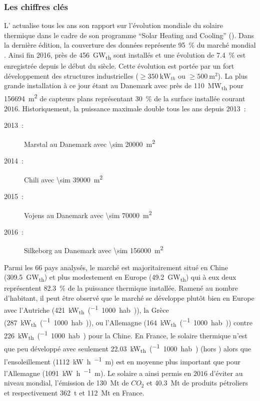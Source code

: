 \subsubsection{Les chiffres clés} %
\label{ssub:les_chiffres_cles}
L’ actualise tous les ans son rapport sur l’évolution mondiale du solaire thermique
dans le cadre de son programme \enquote{Solar Heating and Cooling} (). Dans la dernière
édition, la couverture des données représente \SI{95}{\percent} du
marché mondial \parencite{Weiss2017}. Ainsi fin 2016, près de \SI{456}{\giga\watt_{th}}
sont installés et une évolution de \SI{7.4}{\percent} est enregistrée depuis le début du
siècle. Cette évolution est portée par un fort développement des structures industrielles
($\geq \SI{350}{\kilo\watt_{th}}$ ou $\geq \SI{500}{\metre\squared}$). La plus grande
installation à ce jour étant au Danemark avec près de \SI{110}{\mega\watt_{th}} pour
\SI{156694}{\metre\squared} de capteurs plans représentant \SI{30}{\percent} de la surface
installée courant $2016$. Historiquement, la puissance maximale double tous les ans depuis
2013~:
\begin{description}
    \item[2013~:] Marstal au Danemark avec \SI{\sim 20000}{\metre\squared}
    \item[2014~:] Chili avec \SI{\sim 39000}{\metre\squared}
    \item[2015~:] Vojens au Danemark avec \SI{\sim 70000}{\metre\squared}
    \item[2016~:] Silkeborg  au Danemark avec \SI{\sim 156000}{\metre\squared}
\end{description}
Parmi les $66$ pays analysés, le marché est majoritairement situé en Chine
(\SI{309.5}{\giga\watt_{th}}) et plus modestement en Europe (\SI{49.2}{\giga\watt_{th}})
qui à eux deux représentent \SI{82.3}{\percent} de la puissance thermique installée.
Ramené au nombre d’habitant, il peut être observé que le marché se développe plutôt bien
en Europe avec l’Autriche (\SI{421}{\kilo\watt_{th}\per(1000 hab.)}), la Grèce
(\SI{287}{\kilo\watt_{th}\per(1000 hab.)}), ou l’Allemagne
(\SI{164}{\kilo\watt_{th}\per(1000 hab.)}) contre \SI{226}{\kilo\watt_{th}\per(1000 hab.)}
pour la Chine. En France, le solaire thermique n’est que peu développé avec seulement
\SI{22.03}{\kilo\watt_{th}\per(1000 hab.)} (hors ) alors que l’ensoleillement
(\SI{1112}{\kilo\watt\hour\per\squared\metre}) est en moyenne plus important que
pour l’Allemagne (\SI{1091}{\kilo\watt\hour\per\squared\metre}).
Le solaire a ainsi permis en $2016$ d’éviter au niveau mondial, l’émission de
\SI{130}{\mega\tonne} de $CO_{2}$ et \SI{40.3}{\mega\tonne} de produits pétroliers et
respectivement \SI{362}{\tonne} et \SI{112}{\mega\tonne} en France.


